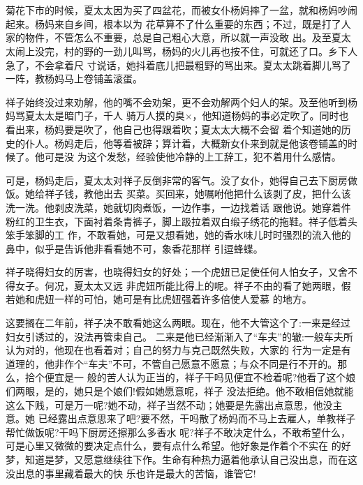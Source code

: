 \documentclass[11pt,a4paper,onecolumn]{article}
\begin{document}
\pagebreak
\section{}

菊花下市的时候，夏太太因为买了四盆花，而被女仆杨妈摔了一盆，就和杨妈吵闹起来。杨妈来自乡间，根本以为
花草算不了什么重要的东西；不过，既是打了人家的物件，不管怎么不重要，总是自己粗心大意，所以就一声没敢
出。及至夏太太闹上没完，村的野的一劲儿叫骂，杨妈的火儿再也按不住，可就还了口。乡下人急了，不会拿着尺
寸说话，她抖着底儿把最粗野的骂出来。夏太太跳着脚儿骂了一阵，教杨妈马上卷铺盖滚蛋。

祥子始终没过来劝解，他的嘴不会劝架，更不会劝解两个妇人的架。及至他听到杨妈骂夏太太是暗门子，千人
骑万人摸的臭×，他知道杨妈的事必定吹了。同时也看出来，杨妈要是吹了，他自己也得跟着吹；夏太太大概不会留
着个知道她的历史的仆人。杨妈走后，他等着被辞；算计着，大概新女仆来到就是他该卷铺盖的时候了。他可是没
为这个发愁，经验使他冷静的上工辞工，犯不着用什么感情。

可是，杨妈走后，夏太太对祥子反倒非常的客气。没了女仆，她得自己去下厨房做饭。她给祥子钱，教他出去
买菜。买回来，她嘱咐他把什么该剥了皮，把什么该洗一洗。他剥皮洗菜，她就切肉煮饭，一边作事，一边找着话
跟他说。她穿着件粉红的卫生衣，下面衬着条青裤子，脚上趿拉着双白缎子绣花的拖鞋。祥子低着头笨手笨脚的工
作，不敢看她，可是又想看她，她的香水味儿时时强烈的流入他的鼻中，似乎是告诉他非看看她不可，象香花那样
引逗蜂蝶。

祥子晓得妇女的厉害，也晓得妇女的好处；一个虎妞已足使任何人怕女子，又舍不得女子。何况，夏太太又远
非虎妞所能比得上的呢。祥子不由的看了她两眼，假若她和虎妞一样的可怕，她可是有比虎妞强着许多倍使人爱慕
的地方。

这要搁在二年前，祥子决不敢看她这么两眼。现在，他不大管这个了:一来是经过妇女引诱过的，没法再管束自己。
二来是他已经渐渐入了``车夫''的辙:一般车夫所认为对的，他现在也看着对；自己的努力与克己既然失败，大家的
行为一定是有道理的，他非作个``车夫''不可，不管自己愿意不愿意；与众不同是行不开的。那么，拾个便宜是一
般的苦人认为正当的，祥子干吗见便宜不检着呢?他看了这个娘们两眼，是的，她只是个娘们!假如她愿意呢，祥子
没法拒绝。他不敢相信她就能这么下贱，可是万一呢?她不动，祥子当然不动；她要是先露出点意思，他没主意。她
已经露出点意思来了吧?要不然，干吗散了杨妈而不马上去雇人，单教祥子帮忙做饭呢?干吗下厨房还擦那么多香水
呢?祥子不敢决定什么，不敢希望什么，可是心里又微微的要决定点什么，要有点什么希望。他好象是作着个不实在
的好梦，知道是梦，又愿意继续往下作。生命有种热力逼着他承认自己没出息，而在这没出息的事里藏着最大的快
乐\myrule 也许是最大的苦恼，谁管它!
\end{document}
